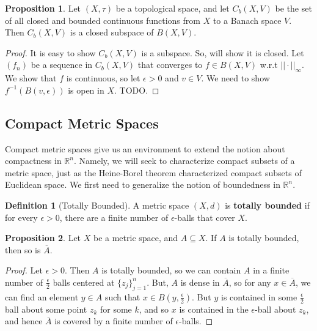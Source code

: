 \documentclass[11pt, oneside]{amsart}   	%
\theoremstyle{definition}
\newtheorem{definition}{Definition}[section]
\newtheorem{prop}{Proposition}[section]
\begin{document}
	\begin{prop}
		Let $(X, \tau)$ be a topological space, and let $C_b(X, V)$ be the set of all closed and bounded continuous 
		functions from $X$ to a Banach space $V$. Then $C_b(X, V)$ is a closed subspace of $B(X, V)$. 
	\end{prop}
	
	\begin{proof}
		It is easy to show $C_b(X, V)$ is a subspace. So, will show it is closed. Let $(f_n)$ be a sequence in 
		$C_b(X, V)$ that converges to $f\in B(X, V)$ w.r.t $||\cdot||_\infty$. We show that $f$ is continuous, so let 
		$\epsilon > 0$ and $v\in V$. We need to show $f^{-1}(B(v, \epsilon))$ is open in $X$. TODO.
	\end{proof}
	
\subsection{Compact Metric Spaces}

	Compact metric spaces give us an environment to extend the notion about compactness in $\mathbb R^n$. Namely, 
	we will seek to characterize compact subsets of a metric space, just as the Heine-Borel theorem characterized 
	compact subsets of Euclidean space. We first need to generalize the notion of boundedness in $\mathbb R^n$.
	
	\begin{definition}[Totally Bounded]
		A metric space $(X, d)$ is \textbf{totally bounded} if for every $\epsilon > 0$, there are a finite number of 
		$\epsilon$-balls that cover $X$.
	\end{definition}
	
	\begin{prop}
		Let $X$ be a metric space, and $A\subseteq X$. If $A$ is totally bounded, then so is $\overline A$. 
	\end{prop}
	
	\begin{proof}
		Let $\epsilon > 0$. Then $A$ is totally bounded, so we can contain $A$ in a finite number of $\frac{\epsilon}{2}$ 
		balls centered at $\{z_j\}_{j = 1}^n$. But, $A$ is dense in $\overline A$, so for any $x\in\overline A$, we can find an 
		element $y\in A$ such that $x\in B(y, \frac{\epsilon}{2})$. But $y$ is contained in some $\frac{\epsilon}{2}$ ball about 
		some point $z_k$ for some $k$, and so $x$ is contained in the $\epsilon$-ball about $z_k$, and hence $\overline 
		A$ is covered by a finite number of $\epsilon$-balls.
	\end{proof}
	
\end{document}
